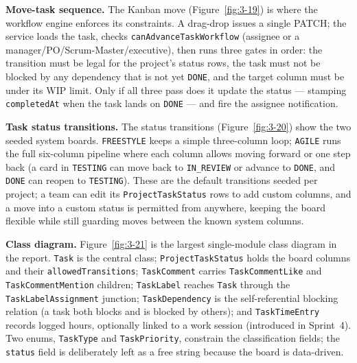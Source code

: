 
\textbf{Move-task sequence.} The Kanban move (Figure~\ref{fig:3-19}) is where the workflow engine
enforces its constraints. A drag-drop issues a single PATCH; the service loads the task, checks
\texttt{canAdvanceTaskWorkflow} (assignee or a manager/PO/Scrum-Master/executive), then runs three
gates in order: the transition must be legal for the project's status rows, the task must not be
blocked by any dependency that is not yet \texttt{DONE}, and the target column must be under its
WIP limit. Only if all three pass does it update the status --- stamping \texttt{completedAt} when
the task lands on \texttt{DONE} --- and fire the assignee notification.


\textbf{Task status transitions.} The status transitions (Figure~\ref{fig:3-20}) show the two
seeded system boards. \texttt{FREESTYLE} keeps a simple three-column loop; \texttt{AGILE} runs the
full six-column pipeline where each column allows moving forward or one step back (a card in
\texttt{TESTING} can move back to \texttt{IN\_REVIEW} or advance to \texttt{DONE}, and \texttt{DONE} can
reopen to \texttt{TESTING}). These are the default transitions seeded per project; a team can edit
its \texttt{ProjectTaskStatus} rows to add custom columns, and a move into a custom status is
permitted from anywhere, keeping the board flexible while still guarding moves between the known
system columns.

{\renewcommand{\figmaxheight}{0.75\textheight}%
}

\textbf{Class diagram.} Figure~\ref{fig:3-21} is the largest single-module class diagram in the
report. \texttt{Task} is the central class; \texttt{ProjectTaskStatus} holds the board columns and their
\texttt{allowedTransitions}; \texttt{TaskComment} carries \texttt{TaskCommentLike} and
\texttt{TaskCommentMention} children; \texttt{TaskLabel} reaches \texttt{Task} through the
\texttt{TaskLabelAssignment} junction; \texttt{TaskDependency} is the self-referential blocking
relation (a task both blocks and is blocked by others); and \texttt{TaskTimeEntry} records logged
hours, optionally linked to a work session (introduced in Sprint~4). Two enums, \texttt{TaskType}
and \texttt{TaskPriority}, constrain the classification fields; the \texttt{status} field is
deliberately left as a free string because the board is data-driven.

